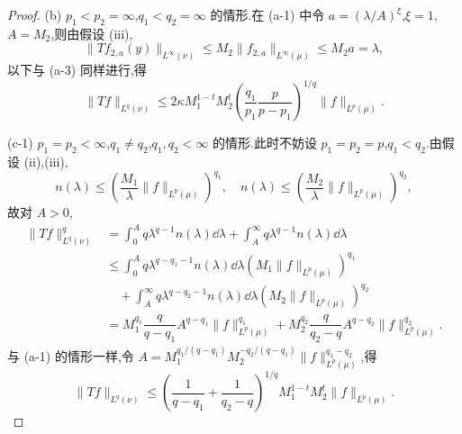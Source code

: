 \begin{proof}
(b) $p_{1} < p_{2} = \infty$,$q_{1} < q_{2} = \infty$ 的情形.在 (a-1) 中令 $a = (\lambda/A)^{\xi}$,$\xi = 1$,$A = M_{2}$,则由假设 (iii),
\begin{equation*}
\| Tf_{2,a}(y) \|_{L^{\infty}(\nu)} \leq M_{2}\| f_{2,a} \|_{L^{\infty}(\mu)} \leq M_{2}a = \lambda,
\end{equation*}
以下与 (a-3) 同样进行,得
\begin{equation*}
\| Tf \|_{L^{q}(\nu)} \leq 2\kappa M_{1}^{1-t}M_{2}^{t}\left(\frac{q_{1}}{p_{1}}\frac{p}{p - p_{1}}\right)^{1/q}\| f \|_{L^{p}(\mu)}.
\end{equation*}

(c-1) $p_{1} = p_{2} < \infty$,$q_{1} \neq q_{2}$,$q_{1}, q_{2} < \infty$ 的情形.此时不妨设 $p_{1} = p_{2} = p$,$q_{1} < q_{2}$.由假设 (ii),(iii),
\begin{equation*}
n(\lambda) \leq \left(\frac{M_{1}}{\lambda}\| f \|_{L^{p}(\mu)}\right)^{q_{1}}, \quad n(\lambda) \leq \left(\frac{M_{2}}{\lambda}\| f \|_{L^{p}(\mu)}\right)^{q_{2}},
\end{equation*}
故对 $A > 0$,
\begin{align*}
\| Tf \|_{L^{q}(\nu)}^{q} & = \displaystyle\int_{0}^{A}q\lambda^{q-1}n(\lambda)\dd \lambda + \int_{A}^{\infty}q\lambda^{q-1}n(\lambda)\dd \lambda \\
& \leq \displaystyle\int_{0}^{A}q\lambda^{q-q_{1}-1}n(\lambda)\dd \lambda\left(M_{1}\| f \|_{L^{p}(\mu)}\right)^{q_{1}} \\
& \quad + \displaystyle\int_{A}^{\infty}q\lambda^{q-q_{2}-1}n(\lambda)\dd \lambda\left(M_{2}\| f \|_{L^{p}(\mu)}\right)^{q_{2}} \\
& = M_{1}^{q_{1}}\dfrac{q}{q - q_{1}}A^{q-q_{1}}\| f \|_{L^{p}(\mu)}^{q_{1}} + M_{2}^{q_{2}}\dfrac{q}{q_{2} - q}A^{q-q_{2}}\| f \|_{L^{p}(\mu)}^{q_{2}}.
\end{align*}
与 (a-1) 的情形一样,令 $A = M_{1}^{q_{1}/(q-q_{1})}M_{2}^{-q_{2}/(q-q_{1})}\| f \|_{L^{p}(\mu)}^{q_{1}-q_{2}}$,得
\begin{equation*}
\| Tf \|_{L^{q}(\nu)} \leq \left(\frac{1}{q - q_{1}} + \frac{1}{q_{2} - q}\right)^{1/q}M_{1}^{1-t}M_{2}^{t}\| f \|_{L^{p}(\mu)}.
\end{equation*}


\end{proof}

